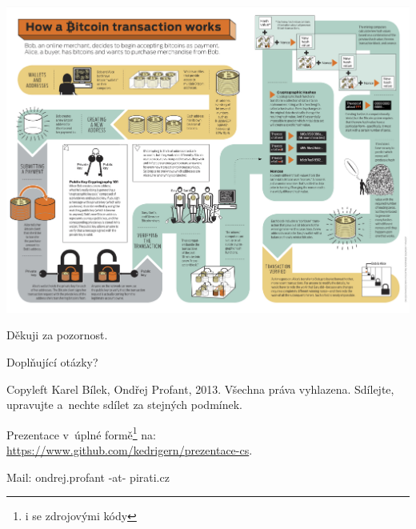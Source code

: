 \documentclass[xetex]{beamer}
\begin{document}
\begin{frame}
	\includegraphics[scale=0.37]{images/how-a-bitcoin-transaction-works.jpg}
\end{frame}


\begin{frame}

	Děkuji za pozornost.

	\bigskip
	
	Doplňující otázky?

	\bigskip

	\bigskip

	\scriptsize
	Copyleft Karel Bílek, Ondřej Profant, 2013. Všechna práva vyhlazena. Sdílejte, upravujte a~nechte sdílet za stejných podmínek. 

	\bigskip

	Prezentace v~úplné formě\footnote{i se zdrojovými kódy} na:\\ 
	\url{https://www.github.com/kedrigern/prezentace-cs}.

	\bigskip

	Mail: ondrej.profant -at- pirati.cz 
\end{frame}
\end{document}
